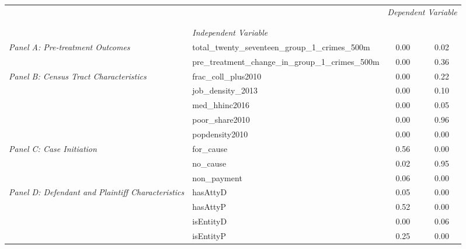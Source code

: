 \begin{tabular}{llcc}
\toprule
 &  & \multicolumn{2}{c}{\textit{Dependent Variable}} \\
\cline{3-4}
\\
 &  &  &  \\
 & \emph{Independent Variable} &  &  \\
\midrule
\multirow[c]{2}{3cm}{\textit{Panel A: Pre-treatment Outcomes}} & total_twenty_seventeen_group_1_crimes_500m & 0.00 & 0.02 \\
 & pre_treatment_change_in_group_1_crimes_500m & 0.00 & 0.36 \\
\cline{1-4}
\multirow[c]{5}{3cm}{\textit{Panel B: Census Tract Characteristics}} & frac_coll_plus2010 & 0.00 & 0.22 \\
 & job_density_2013 & 0.00 & 0.10 \\
 & med_hhinc2016 & 0.00 & 0.05 \\
 & poor_share2010 & 0.00 & 0.96 \\
 & popdensity2010 & 0.00 & 0.00 \\
\cline{1-4}
\multirow[c]{3}{3cm}{\textit{Panel C: Case Initiation}} & for_cause & 0.56 & 0.00 \\
 & no_cause & 0.02 & 0.95 \\
 & non_payment & 0.06 & 0.00 \\
\cline{1-4}
\multirow[c]{4}{3cm}{\textit{Panel D: Defendant and Plaintiff Characteristics}} & hasAttyD & 0.05 & 0.00 \\
 & hasAttyP & 0.52 & 0.00 \\
 & isEntityD & 0.00 & 0.06 \\
 & isEntityP & 0.25 & 0.00 \\
\cline{1-4}
\bottomrule
\end{tabular}
